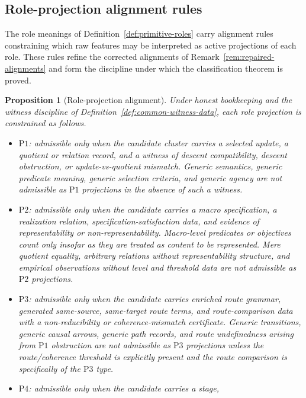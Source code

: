 \documentclass[11pt]{article}
\newtheorem{proposition}[theorem]{Proposition}
\theoremstyle{definition}
\newcommand{\Pone}{\ensuremath{\mathrm{P1}}}
\newcommand{\Ptwo}{\ensuremath{\mathrm{P2}}}
\newcommand{\Pthree}{\ensuremath{\mathrm{P3}}}
\newcommand{\Pfour}{\ensuremath{\mathrm{P4}}}
\begin{document}
\subsection{Role-projection alignment rules}\label{subsec:alignment-rules}

The role meanings of Definition~\ref{def:primitive-roles} carry
alignment rules constraining which raw features may be interpreted as
active projections of each role. These rules refine the corrected
alignments of Remark~\ref{rem:repaired-alignments} and form the
discipline under which the classification theorem is proved.

\begin{proposition}[Role-projection alignment]\label{prop:alignment-rules}
Under honest bookkeeping and the witness discipline of
Definition~\ref{def:common-witness-data}, each role projection is
constrained as follows.
\begin{itemize}[topsep=2pt,itemsep=1pt]
  \item \Pone{}: admissible only when the candidate cluster carries a
    selected update, a quotient or relation record, and a witness of
    descent compatibility, descent obstruction, or update-vs-quotient
    mismatch. Generic semantics, generic predicate meaning, generic
    selection criteria, and generic agency are not admissible as
    \Pone{} projections in the absence of such a witness.
  \item \Ptwo{}: admissible only when the candidate carries a macro
    specification, a realization relation, specification-satisfaction
    data, and evidence of representability or non-representability.
    Macro-level predicates or objectives count only insofar as they are
    treated as content to be represented. Mere quotient equality,
    arbitrary relations without representability structure, and
    empirical observations without level and threshold data are not
    admissible as \Ptwo{} projections.
  \item \Pthree{}: admissible only when the candidate carries enriched
    route grammar, generated same-source, same-target route terms, and
    route-comparison data with a non-reducibility or coherence-mismatch
    certificate. Generic transitions, generic causal arrows, generic
    path records, and route undefinedness arising from \Pone{}
    obstruction are not admissible as \Pthree{} projections unless the
    route/coherence threshold is explicitly present and the route
    comparison is specifically of the \Pthree{} type.
  \item \Pfour{}: admissible only when the candidate carries a stage,

\end{itemize}
\end{proposition}
\end{document}
